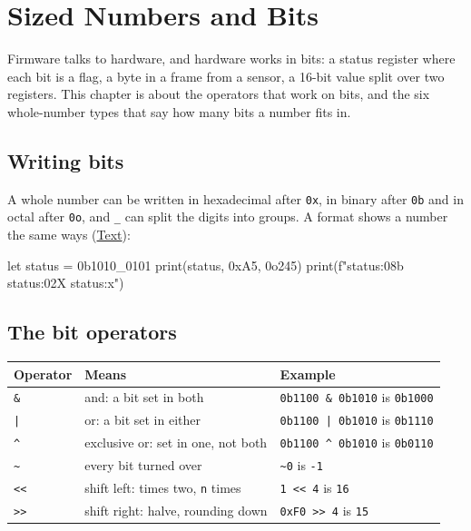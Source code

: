 \chapter{Sized Numbers and Bits}\label{ch-sized-numbers}

Firmware talks to hardware, and hardware works in bits: a status
register where each bit is a flag, a byte in a frame from a sensor, a
16-bit value split over two registers. This chapter is about the
operators that work on bits, and the six whole-number types that say
how many bits a number fits in.

\section{Writing bits}

A whole number can be written in hexadecimal after \verb|0x|, in
binary after \verb|0b| and in octal after \verb|0o|, and \verb|_| can
split the digits into groups. A format shows a number the same ways
(\hyperref[ch-text]{Text}):

\begin{zeno}
let status = 0b1010_0101
print(status, 0xA5, 0o245)
print(f"{status:08b} {status:02X} {status:x}")
\end{zeno}

\section{The bit operators}

\begin{center}
\begin{tabular}{lll}
\toprule
Operator & Means & Example \\
\midrule
\verb|&| & and: a bit set in both & \verb|0b1100 & 0b1010| is \verb|0b1000| \\
\verb!|! & or: a bit set in either & \verb!0b1100 | 0b1010! is \verb|0b1110| \\
\verb|^| & exclusive or: set in one, not both & \verb|0b1100 ^ 0b1010| is \verb|0b0110| \\
\verb|~| & every bit turned over & \verb|~0| is \verb|-1| \\
\verb|<<| & shift left: times two, \verb|n| times & \verb|1 << 4| is \verb|16| \\
\verb|>>| & shift right: halve, rounding down & \verb|0xF0 >> 4| is \verb|15| \\
\bottomrule
\end{tabular}
\end{center}

